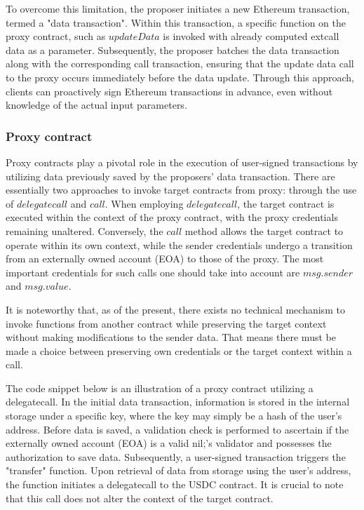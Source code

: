 To overcome this limitation, the proposer initiates a new Ethereum transaction, termed a 
"data transaction". Within this transaction, a specific function on the proxy contract, such 
as \(updateData\) is invoked with already computed extcall data as a parameter. Subsequently, 
the proposer batches the data transaction along with the corresponding call transaction, 
ensuring that the update data call to the proxy occurs immediately before the data update. 
Through this approach, clients can proactively sign Ethereum transactions in advance, even 
without knowledge of the actual input parameters.


\subsubsection{Proxy contract}

Proxy contracts play a pivotal role in the execution of user-signed transactions by utilizing 
data previously saved by the proposers' data transaction. There are essentially two approaches 
to invoke target contracts from proxy: through the use of \(delegatecall\) and \(call\). When 
employing \(delegatecall\), the target contract is executed within the context of the proxy 
contract, with the proxy credentials remaining unaltered. Conversely, the \(call\) method allows 
the target contract to operate within its own context, while the sender credentials undergo a 
transition from an externally owned account (EOA) to those of the proxy. The most important 
credentials for such calls one should take into account are \(msg.sender\) and \(msg.value\).

It is noteworthy that, as of the present, there exists no technical mechanism to invoke 
functions from another contract while preserving the target context without making modifications 
to the sender data. That means there must be made a choice between preserving own credentials or 
the target context within a call.

The code snippet below is an illustration of a proxy contract utilizing a delegatecall. In the 
initial data transaction, information is stored in the internal storage under a specific key, 
where the key may simply be a hash of the user's address. Before data is saved, a validation 
check is performed to ascertain if the externally owned account (EOA) is a valid nil;'s validator 
and possesses the authorization to save data. Subsequently, a user-signed transaction triggers 
the "transfer" function. Upon retrieval of data from storage using the user's address, the 
function initiates a delegatecall to the USDC contract. It is crucial to note that this call 
does not alter the context of the target contract.

